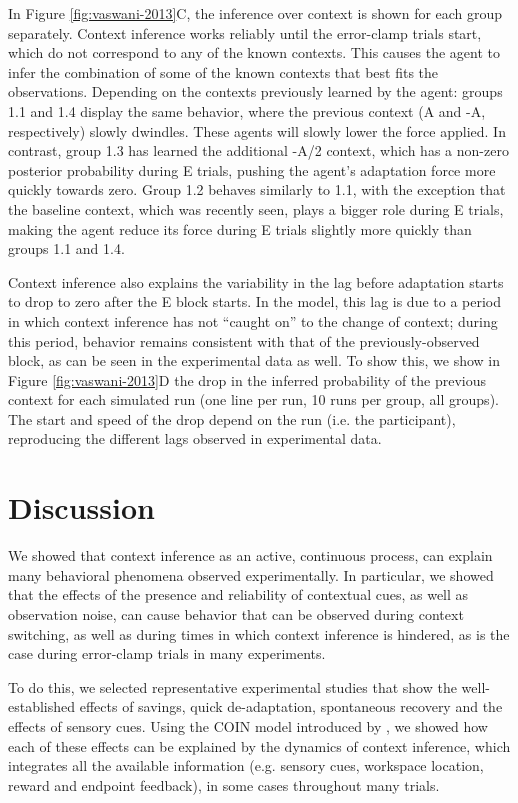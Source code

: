 \documentclass[a4paper,doc,floatsintext,natbib]{apa6}
\def \fref #1{Figure \ref{#1}}     %
\begin{document}
In \fref{fig:vaswani-2013}C, the inference over context is shown for each group separately. Context inference works reliably until the error-clamp trials start, which do not correspond to any of the known contexts. This causes the agent to infer the combination of some of the known contexts that best fits the observations. Depending on the contexts previously learned by the agent: groups 1.1 and 1.4 display the same behavior, where the previous context (A and -A, respectively) slowly dwindles. These agents will slowly lower the force applied. In contrast, group 1.3 has learned the additional -A/2 context, which has a non-zero posterior probability during E trials, pushing the agent's adaptation force more quickly towards zero. Group 1.2 behaves similarly to 1.1, with the exception that the baseline context, which was recently seen, plays a bigger role during E trials, making the agent reduce its force during E trials slightly more quickly than groups 1.1 and 1.4.

Context inference also explains the variability in the lag before adaptation starts to drop to zero after the E block starts. In the model, this lag is due to a period in which context inference has not ``caught on'' to the change of context; during this period, behavior remains consistent with that of the previously-observed block, as can be seen in the experimental data as well. To show this, we show in \fref{fig:vaswani-2013}D the drop in the inferred probability of the previous context for each simulated run (one line per run, 10 runs per group, all groups). The start and speed of the drop depend on the run (i.e. the participant), reproducing the different lags observed in experimental data.

\section{Discussion}
We showed that context inference as an active, continuous process, can explain many behavioral phenomena observed experimentally. In particular, we showed that the effects of the presence and reliability of contextual cues, as well as observation noise, can cause behavior that can be observed during context switching, as well as during times in which context inference is hindered, as is the case during error-clamp trials in many experiments.

To do this, we selected representative experimental studies that show the well-established effects of savings, quick de-adaptation, spontaneous recovery and the effects of sensory cues. Using the COIN model introduced by \cite{Heald_Contextual_2021}, we showed how each of these effects can be explained by the dynamics of context inference, which integrates all the available information (e.g. sensory cues, workspace location, reward and endpoint feedback), in some cases throughout many trials.
\end{document}

